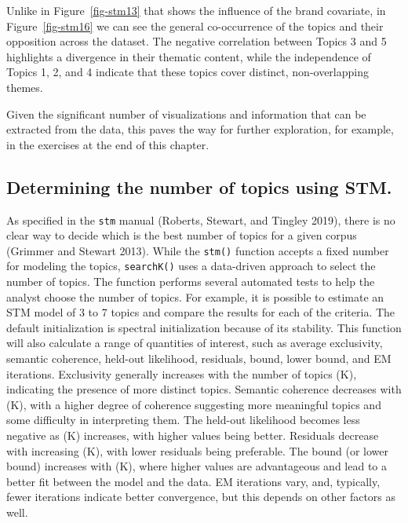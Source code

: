 Unlike in Figure~\ref{fig-stm13} that shows the influence of the brand
covariate, in Figure~\ref{fig-stm16} we can see the general
co-occurrence of the topics and their opposition across the dataset. The negative
correlation between Topics 3 and 5 highlights a divergence in their
thematic content, while the independence of Topics 1, 2, and 4 indicate
that these topics cover distinct, non-overlapping themes.

Given the significant number of visualizations and information that can
be extracted from the data, this paves the way for further exploration,
for example, in the exercises at the end of this chapter.

\subsection{Determining the number of topics using
STM.}\label{determining-the-number-of-topics-with-stm.}

As specified in the \texttt{stm} manual (Roberts,
Stewart, and Tingley 2019), there is no clear way to decide which is
the best number of topics for a given corpus (Grimmer and Stewart 2013).
While the \texttt{stm()} function accepts a fixed number for modeling
the topics, \texttt{searchK()} uses a data-driven approach to
select the number of topics. The function performs several
automated tests to help the analyst choose the number of topics. For
example, it is possible to estimate an STM model of 3 to 7 topics and compare
the results for each of the criteria. The default initialization is spectral initialization because of its stability. This function will
also calculate a range of quantities of interest, such as average
exclusivity, semantic coherence, held-out likelihood, residuals, bound,
lower bound, and EM iterations. Exclusivity generally increases with the
number of topics (K), indicating the presence of more distinct topics. Semantic
coherence decreases with (K), with a higher degree of coherence suggesting more
meaningful topics and some difficulty in interpreting them. The
held-out likelihood becomes less negative as (K) increases, with higher
values being better. Residuals decrease with increasing (K), with lower
residuals being preferable. The bound (or lower bound) increases with
(K), where higher values are advantageous and lead to a better fit between the model
and the data. EM iterations vary, and, typically, fewer iterations
indicate better convergence, but this depends on other factors as well.

